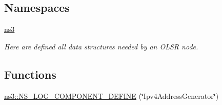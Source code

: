 \subsection*{Namespaces}
\begin{DoxyCompactItemize}
\item 
 \hyperlink{namespacens3}{ns3}
\begin{DoxyCompactList}\small\item\em Here are defined all data structures needed by an O\+L\+SR node. \end{DoxyCompactList}\end{DoxyCompactItemize}
\subsection*{Functions}
\begin{DoxyCompactItemize}
\item 
\hyperlink{namespacens3_a6401a2533df42194c0ee7a4b7c4a272d}{ns3\+::\+N\+S\+\_\+\+L\+O\+G\+\_\+\+C\+O\+M\+P\+O\+N\+E\+N\+T\+\_\+\+D\+E\+F\+I\+NE} (\char`\"{}Ipv4\+Address\+Generator\char`\"{})
\end{DoxyCompactItemize}
